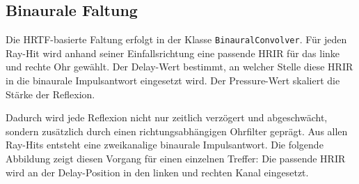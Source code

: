 \subsection{Binaurale Faltung}
\label{subsec:binaural_convolution_hrtf}

Die HRTF-basierte Faltung erfolgt in der Klasse \texttt{BinauralConvolver}. Für jeden Ray-Hit wird anhand seiner Einfallsrichtung eine passende HRIR für das linke und rechte Ohr gewählt. Der Delay-Wert bestimmt, an welcher Stelle diese HRIR in die binaurale Impulsantwort eingesetzt wird. Der Pressure-Wert skaliert die Stärke der Reflexion.

Dadurch wird jede Reflexion nicht nur zeitlich verzögert und abgeschwächt, sondern zusätzlich durch einen richtungsabhängigen Ohrfilter geprägt. Aus allen Ray-Hits entsteht eine zweikanalige binaurale Impulsantwort. Die folgende Abbildung zeigt diesen Vorgang für einen einzelnen Treffer: Die passende HRIR wird an der Delay-Position in den linken und rechten Kanal eingesetzt.


